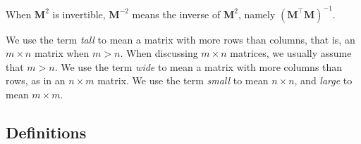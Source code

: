 \documentclass[10pt,oneside,x11names]{article}
\begin{document}
When \(\mathbold{M}^2\) is invertible, \(\mathbold{M}^{-2}\)
means the inverse of \(\mathbold{M}^2\), namely
\(\left(\mathbold{M}^\intercal\mathbold{M}\right)^{-1}\).

We use the term \emph{tall} to mean a matrix with more rows than columns, that is, an
\(m\times{n}\)
matrix when
\(m>n\). When discussing
\(m\times{n}\)
matrices, we  usually assume that
\(m>n\).
We use the term \emph{wide} to mean a matrix with
more columns than rows, as in an \(n\times{m}\) matrix. We use the term \emph{small} to
mean \(n\times{n}\), and \emph{large} to mean \(m\times{m}\). 

\subsection{Definitions}
\label{sec:orgheadline4}
\end{document}
